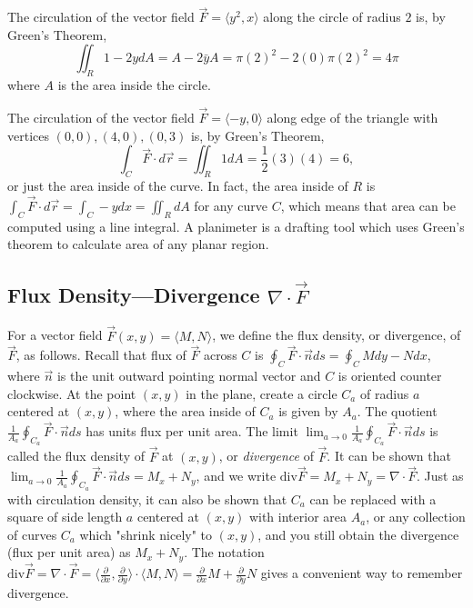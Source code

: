 \begin{example}
The circulation of the vector field $\vec F = \langle y^2,x\rangle$
along the circle of radius $2$ is, by Green's Theorem, $$\iint_R 1-2ydA =
A-2\bar y A = \pi(2)^2-2(0)\pi(2)^2 = 4\pi$$ where $A$ is the area inside the
circle. 
\end{example}
\begin{example}
The circulation of the vector field $\vec F=\langle
-y,0\rangle$ along edge of the triangle with vertices
$(0,0),(4,0),(0,3)$ is, by Green's Theorem, $$\int_C \vec F\cdot d\vec r =
\iint_R 1 dA = \frac{1}{2}(3)(4) = 6,$$ or just the area inside of the
curve.  In fact, the area inside of $R$ is $\int_C \vec F\cdot d\vec r =\int_C -y
dx =\iint_RdA$ for any curve $C$, which means that area can be
computed using a line integral.  A planimeter is a drafting tool which
uses Green's theorem to calculate area of any planar region.

\end{example}

\subsection{Flux Density---Divergence $\nabla\cdot \vec F$}

For a vector field $\vec F(x,y)=\langle M,N\rangle$, we define the flux
density, or divergence, of $\vec F$, as follows.  Recall that flux of
$\vec F$ across $C$ is $\oint_C \vec F \cdot \vec n ds = \oint_C Mdy-Ndx$, where
$\vec n$ is the unit outward pointing normal vector and $C$ is
oriented counter clockwise. At the point $(x,y)$ in the plane, create
a circle $C_a$ of radius $a$ centered at $(x,y)$, where the area
inside of $C_a$ is given by $A_a$. The quotient $\frac{1}{A_a}\oint_{C_a}
\vec F \cdot \vec n ds$ has units flux per unit area.  The limit $\lim_{a\to
  0} \frac{1}{A_a}\oint_{C_a} \vec F \cdot \vec n ds$ is called the flux
density of $\vec F$ at $(x,y)$, or \emph{divergence} of $\vec F$.  It
can be shown that $\lim_{a\to 0} \frac{1}{A_a}\oint_{C_a} \vec F \cdot \vec n ds
= M_x+N_y$, and we write $\text{div} \vec F = M_x+N_y = \nabla \cdot \vec
F$. Just as with circulation density, it can also be shown that $C_a$
can be replaced with a square of side length $a$ centered at $(x,y)$
with interior area $A_a$, or any collection of curves $C_a$ which
"shrink nicely" to $(x,y)$, and you still obtain the divergence (flux
per unit area) as $M_x+N_y$.  The notation $\text{div} \vec F = \nabla \cdot
\vec F = \langle\frac{\partial}{\partial x},\frac{\partial}{\partial y}\rangle\cdot\langle M,N\rangle =
\frac{\partial}{\partial x}M+\frac{\partial}{\partial y}N$ gives a convenient way to remember
divergence.

